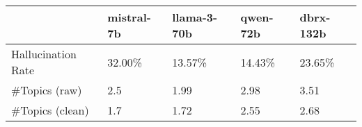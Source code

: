 \begin{tabular}{lllll}
\toprule
 & mistral-7b & llama-3-70b & qwen-72b & dbrx-132b \\
\midrule
Hallucination Rate & 32.00\% & 13.57\% & 14.43\% & 23.65\% \\
\#Topics (raw) & 2.5 & 1.99 & 2.98 & 3.51 \\
\#Topics (clean) & 1.7 & 1.72 & 2.55 & 2.68 \\
\bottomrule
\end{tabular}
